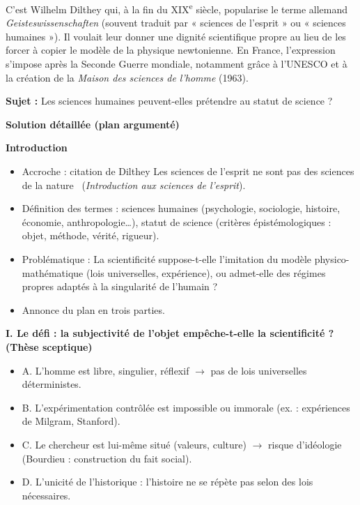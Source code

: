 \documentclass[11pt]{article}
\newcommand{\cle}[1]{{\popxbold\color{popdark}#1}}
\begin{document}
\begin{savaistu}
C'est Wilhelm Dilthey qui, à la fin du XIX\textsuperscript{e} siècle, popularise le terme allemand \emph{Geisteswissenschaften} (souvent traduit par « sciences de l'esprit » ou « sciences humaines »). Il voulait leur donner une \cle{dignité scientifique propre} au lieu de les forcer à copier le modèle de la physique newtonienne. En France, l'expression s'impose après la Seconde Guerre mondiale, notamment grâce à l'UNESCO et à la création de la \emph{Maison des sciences de l'homme} (1963).
\end{savaistu}

\begin{exoresolu}
\textbf{Sujet :} \guillemotleft Les sciences humaines peuvent-elles prétendre au statut de science ? \guillemotright

\textbf{Solution détaillée (plan argumenté)}

\textbf{Introduction}
\begin{itemize}
    \item Accroche : citation de Dilthey \guillemotleft Les sciences de l'esprit ne sont pas des sciences de la nature \guillemotright\ (\emph{Introduction aux sciences de l'esprit}).
    \item Définition des termes : \cle{sciences humaines} (psychologie, sociologie, histoire, économie, anthropologie…), \cle{statut de science} (critères épistémologiques : objet, méthode, vérité, rigueur).
    \item Problématique : La scientificité suppose-t-elle l'imitation du modèle physico-mathématique (lois universelles, expérience), ou admet-elle des régimes propres adaptés à la singularité de l'humain ?
    \item Annonce du plan en trois parties.
\end{itemize}

\textbf{I. Le défi : la subjectivité de l'objet empêche-t-elle la scientificité ? (Thèse sceptique)}
\begin{itemize}
    \item A. L'homme est libre, singulier, réflexif $\rightarrow$ pas de lois universelles déterministes.
    \item B. L'expérimentation contrôlée est impossible ou immorale (ex. : expériences de Milgram, Stanford).
    \item C. Le chercheur est lui-même situé (valeurs, culture) $\rightarrow$ risque d'idéologie (Bourdieu : construction du fait social).
    \item D. L'unicité de l'historique : l'histoire ne se répète pas selon des lois nécessaires.
\end{itemize}


\end{exoresolu}
\end{document}
